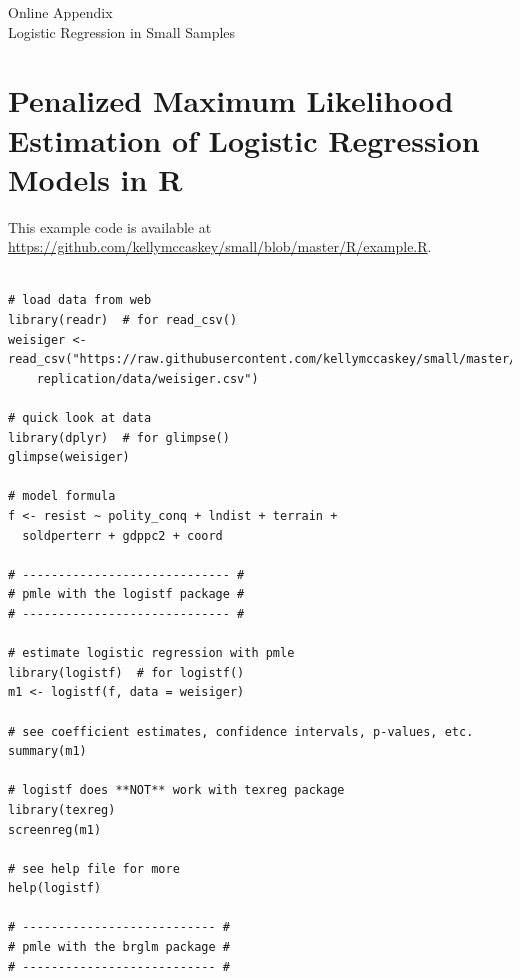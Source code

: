 \documentclass[12pt]{article}
\begin{document}
\singlespace 
\newpage
\normalsize


%

\newpage
\begin{appendix}
\begin{center}
{\LARGE Online Appendix}\\
\vspace{3mm}
{\large Logistic Regression in Small Samples}\\\vspace{2mm}
\end{center}

\section{Penalized Maximum Likelihood Estimation of Logistic Regression Models in R}\label{sec:pmle-in-R}

This example code is available at \href{https://github.com/kellymccaskey/small/blob/master/R/example.R}{https://github.com/kellymccaskey/small/blob/master/R/example.R}.

\begin{footnotesize}
\begin{verbatim}

# load data from web
library(readr)  # for read_csv()
weisiger <- read_csv("https://raw.githubusercontent.com/kellymccaskey/small/master/weisiger-
	replication/data/weisiger.csv") 

# quick look at data
library(dplyr)  # for glimpse()
glimpse(weisiger)

# model formula
f <- resist ~ polity_conq + lndist + terrain + 
  soldperterr + gdppc2 + coord

# ----------------------------- #
# pmle with the logistf package #
# ----------------------------- #

# estimate logistic regression with pmle
library(logistf)  # for logistf()
m1 <- logistf(f, data = weisiger)

# see coefficient estimates, confidence intervals, p-values, etc.
summary(m1)

# logistf does **NOT** work with texreg package
library(texreg)
screenreg(m1)

# see help file for more
help(logistf)

# --------------------------- #
# pmle with the brglm package #
# --------------------------- #


\end{verbatim}
\end{footnotesize}
\end{appendix}
\end{document}
